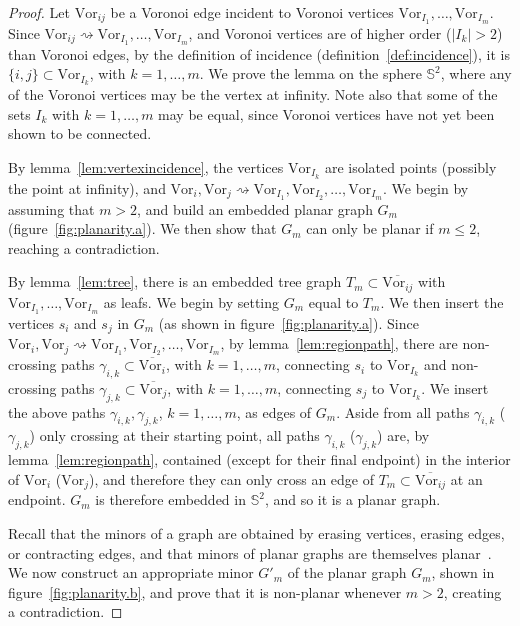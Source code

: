 \documentclass[11pt]{article}
\newcommand{\Vor}{\text{Vor}}
\begin{document}
\begin{proof}
	Let $\Vor_{ij}$ be a Voronoi edge incident to Voronoi vertices $\Vor_{I_1},\dots,\Vor_{I_m}$. 
Since $\Vor_{ij} \rightsquigarrow \Vor_{I_1},\dots,\Vor_{I_m}$, 
		and Voronoi vertices are of higher order ($|I_k| > 2$) than Voronoi edges, 
		by the definition of incidence (definition~\ref{def:incidence}), it is $\{i,j\} \subset \Vor_{I_k}$, with $k=1,\dots,m$. 
	We prove the lemma on the sphere $\mathbb{S}^2$, where any of the Voronoi vertices may be the vertex at infinity. 
	Note also that some of the sets $I_k$ with $k=1,\dots,m$ may be equal, 
	since Voronoi vertices have not yet been shown to be connected. 
	

By lemma~\ref{lem:vertexincidence}, 
	the vertices $\Vor_{I_k}$ are isolated points
	(possibly the point at infinity), 
	and $\Vor_i,\Vor_j\rightsquigarrow \Vor_{I_1},\Vor_{I_2},\dots,\Vor_{I_m}$. 
We begin by assuming that $m>2$, and build an embedded planar graph $G_m$ (figure~\ref{fig:planarity.a}). 
We then show that $G_m$ can only be planar if $m\le 2$, reaching a contradiction. 


By lemma~\ref{lem:tree}, there is an embedded tree graph $T_m\subset\overline{\Vor_{ij}}$
	with $\Vor_{I_1},\dots,\Vor_{I_m}$ as leafs. 
We begin by setting $G_m$ equal to $T_m$. 
We then insert the vertices $s_i$ and $s_j$ in $G_m$ (as shown in figure~\ref{fig:planarity.a}). 
Since $\Vor_i,\Vor_j \rightsquigarrow \Vor_{I_1},\Vor_{I_2},\dots,\Vor_{I_m}$, 
	by lemma~\ref{lem:regionpath}, 
	there are non-crossing paths $\gamma_{i,k}\subset\overline{\Vor_i}$, with $k=1,\dots,m$, 
	connecting $s_i$ to $\Vor_{I_k}$ and non-crossing paths $\gamma_{j,k}\subset\overline{\Vor_j}$, with $k=1,\dots,m$, 
	connecting $s_j$ to $\Vor_{I_k}$. We insert the above paths $\gamma_{i,k},\gamma_{j,k}$, $k=1,\dots,m$, as edges of $G_m$. 
Aside from all paths $\gamma_{i,k}$ ($\gamma_{j,k}$) only crossing
	 at their starting point,
all paths $\gamma_{i,k}$ ($\gamma_{j,k}$) are, by lemma~\ref{lem:regionpath},
	 contained (except for their final endpoint) 
	in the interior of $\Vor_i$ ($\Vor_j$), 
	and therefore they can only cross an edge of $T_m\subset\overline{\Vor_{ij}}$ at an endpoint. 
$G_m$ is therefore embedded in $\mathbb{S}^2$, and so it is a planar graph. 


Recall that the minors of a graph are obtained by erasing vertices, erasing edges, or contracting edges, 
	and that minors of planar graphs are themselves planar~\cite[p.\ 269]{bondy2008graph}. 
We now construct an appropriate minor $G'_m$ of the planar graph $G_m$, 
	shown in figure~\ref{fig:planarity.b}, 
	and prove that it is non-planar whenever $m > 2$, creating a contradiction. 





\end{proof}
\end{document}
